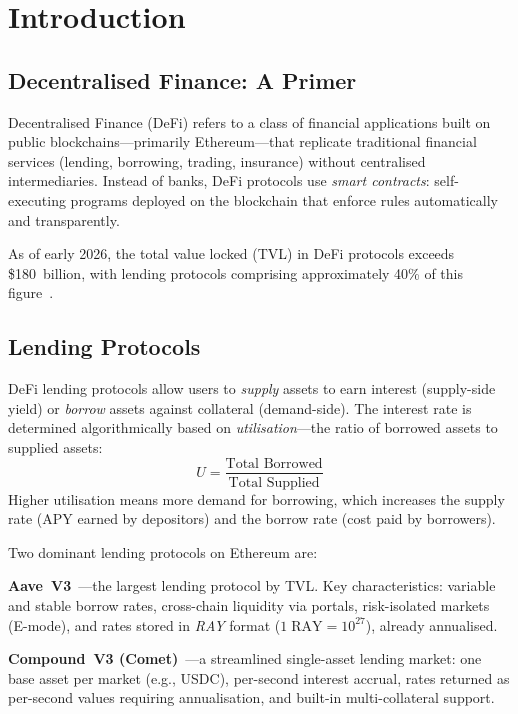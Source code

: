 \documentclass[12pt]{article}
\begin{document}
\section{Introduction}

\subsection{Decentralised Finance: A Primer}

Decentralised Finance (DeFi) refers to a class of financial applications built on public blockchains---primarily Ethereum---that replicate traditional financial services (lending, borrowing, trading, insurance) without centralised intermediaries.
Instead of banks, DeFi protocols use \emph{smart contracts}: self-executing programs deployed on the blockchain that enforce rules automatically and transparently.

As of early 2026, the total value locked (TVL) in DeFi protocols exceeds \$180~billion, with lending protocols comprising approximately 40\% of this figure~\cite{defillama}.

\subsection{Lending Protocols}

DeFi lending protocols allow users to \emph{supply} assets to earn interest (supply-side yield) or \emph{borrow} assets against collateral (demand-side).
The interest rate is determined algorithmically based on \emph{utilisation}---the ratio of borrowed assets to supplied assets:
\begin{equation}
  U = \frac{\text{Total Borrowed}}{\text{Total Supplied}}
  \label{eq:utilisation}
\end{equation}
Higher utilisation means more demand for borrowing, which increases the supply rate (APY earned by depositors) and the borrow rate (cost paid by borrowers).

Two dominant lending protocols on Ethereum are:

\textbf{Aave~V3}~\cite{aave}---the largest lending protocol by TVL.
Key characteristics: variable and stable borrow rates, cross-chain liquidity via portals, risk-isolated markets (E-mode), and rates stored in \emph{RAY} format ($1\;\text{RAY} = 10^{27}$), already annualised.

\textbf{Compound~V3 (Comet)}~\cite{compound}---a streamlined single-asset lending market:
one base asset per market (e.g., USDC), per-second interest accrual, rates returned as per-second values requiring annualisation, and built-in multi-collateral support.
\end{document}
